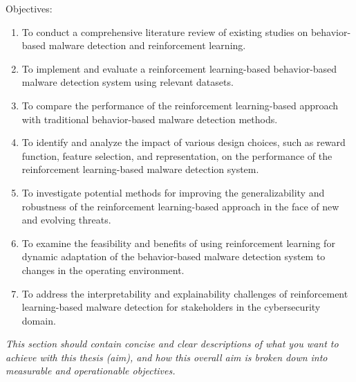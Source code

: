 \documentclass[12pt,a4paper,twoside]{article}
\begin{document}
Objectives:
\begin{enumerate}

    \item To conduct a comprehensive literature review of existing studies on behavior-based malware detection and reinforcement learning.
    \item To implement and evaluate a reinforcement learning-based behavior-based malware detection system using relevant datasets.
    \item To compare the performance of the reinforcement learning-based approach with traditional behavior-based malware detection methods.
    \item To identify and analyze the impact of various design choices, such as reward function, feature selection, and representation, on the performance of the reinforcement learning-based malware detection system.
    \item To investigate potential methods for improving the generalizability and robustness of the reinforcement learning-based approach in the face of new and evolving threats.
    \item To examine the feasibility and benefits of using reinforcement learning for dynamic adaptation of the behavior-based malware detection system to changes in the operating environment.
    \item To address the interpretability and explainability challenges of reinforcement learning-based malware detection for stakeholders in the cybersecurity domain.
\end{enumerate}

\textit{
This section should contain concise and clear descriptions of what you want to achieve with this thesis (aim), and how this overall aim is broken down into measurable and operationable objectives. 
}
\end{document}
